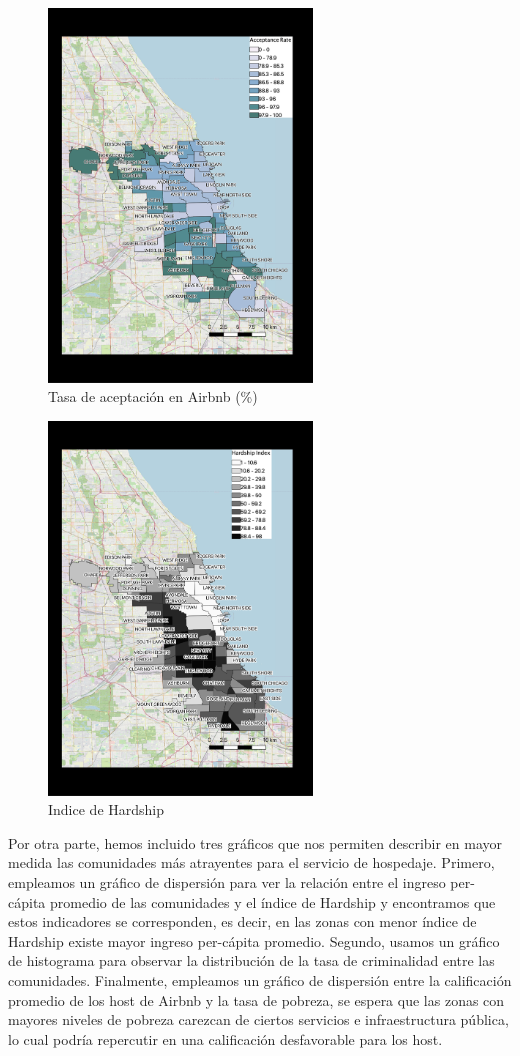 \documentclass[11pt,a4paper]{article}
\begin{document}
\begin{figure}[!h]
    \centering
    \includegraphics[width=7cm]{Acceptance Rate.png}
   \caption{Tasa de aceptación en Airbnb (\%)}
    \label{fig:my_label}
\end{figure}

\begin{figure}[!h]
    \centering
    \includegraphics[width=7cm]{Hardship Index.png}
   \caption{Indice de Hardship}
    \label{fig:my_label}
\end{figure}

Por otra parte, hemos incluido tres gráficos que nos permiten describir en mayor medida las comunidades más atrayentes para el servicio de hospedaje. Primero, empleamos un gráfico de dispersión para ver la relación entre el ingreso per-cápita promedio de las comunidades y el índice de Hardship y encontramos que estos indicadores se corresponden, es decir, en las zonas con menor índice de Hardship existe mayor ingreso per-cápita promedio. Segundo, usamos un gráfico de histograma para observar la distribución de la tasa de criminalidad entre las comunidades. Finalmente, empleamos un gráfico de dispersión entre la calificación promedio de los host de Airbnb y la tasa de pobreza, se espera que las zonas con mayores niveles de pobreza carezcan de ciertos servicios e infraestructura pública, lo cual podría repercutir en una calificación desfavorable para los host.
\end{document}
